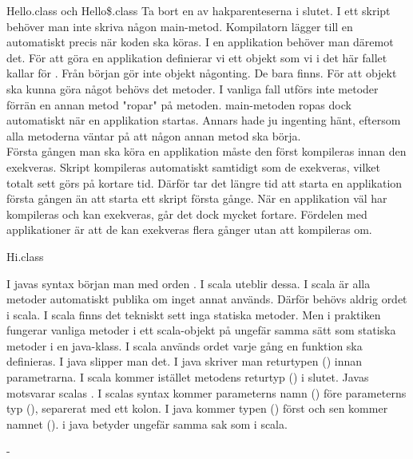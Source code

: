 \Task 

\Subtask Hello.class och Hello\$.class
\Subtask Ta bort en av hakparenteserna i slutet.
\Subtask I ett skript behöver man inte skriva någon main-metod. Kompilatorn lägger till en automatiskt precis när koden ska köras. I en applikation behöver man däremot det. För att göra en applikation definierar vi ett objekt som vi i det här fallet kallar för . Från början gör inte objekt någonting. De bara finns. För att objekt ska kunna göra något behövs det metoder. I vanliga fall utförs inte metoder förrän en annan metod "ropar" på metoden. main-metoden ropas dock automatiskt när en applikation startas. Annars hade ju ingenting hänt, eftersom alla metoderna väntar på att någon annan metod ska börja. \\
\Subtask Första gången man ska köra en applikation måste den först kompileras innan den exekveras. Skript kompileras automatiskt samtidigt som de exekveras, vilket totalt sett görs på kortare tid. Därför tar det längre tid att starta en applikation första gången än att starta ett skript första gånge. När en applikation väl har kompileras och kan exekveras, går det dock mycket fortare. Fördelen med applikationer är att de kan exekveras flera gånger utan att kompileras om.

\Task 
\Subtask Hi.class

\Subtask I javas syntax början man med orden . I scala uteblir dessa. I scala är alla metoder automatiskt publika om inget annat används. Därför behövs aldrig ordet  i scala. I scala finns det tekniskt sett inga statiska metoder. Men i praktiken fungerar vanliga metoder i ett scala-objekt på ungefär samma sätt som statiska metoder i en java-klass. I scala används ordet  varje gång en funktion ska definieras. I java slipper man det. I java skriver man returtypen () innan parametrarna. I scala kommer istället metodens returtyp () i slutet. Javas  motsvarar scalas . I scalas syntax kommer parameterns namn () före parameterns typ (), separerat med ett kolon. I java kommer typen () först och sen kommer namnet ().  i java betyder ungefär samma sak som  i scala.

\Subtask -

